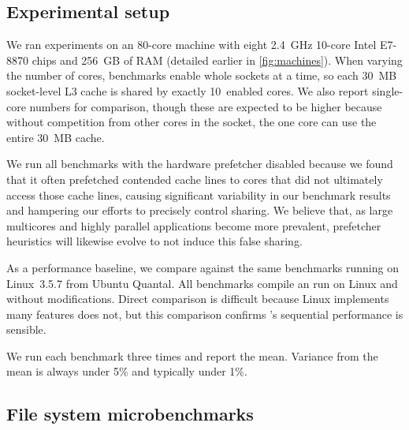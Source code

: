 \subsection{Experimental setup}
\label{sec:topic:ben}


We ran experiments on an 80-core machine with eight 2.4~GHz 10-core
Intel E7-8870 chips and 256~GB of RAM (detailed earlier in
\cref{fig:machines}).
%
When varying the number of
cores, benchmarks enable whole sockets at a time, so each 30~MB
socket-level L3 cache is shared by exactly 10~enabled cores.
We also report single-core numbers for
comparison, though these are expected to be higher because without
competition from other cores in the socket, the one
core can use the entire 30~MB cache.

We run all benchmarks with the hardware prefetcher disabled because we
found that it often prefetched contended cache lines to cores that did
not ultimately access those cache lines, causing significant
variability in our benchmark results and hampering our efforts to
precisely control sharing.  We believe that, as large multicores and
highly parallel applications become more prevalent, prefetcher
heuristics will likewise evolve to not induce this false sharing.

As a performance baseline, we compare against the same
benchmarks running on Linux~3.5.7 from Ubuntu Quantal.
%
All benchmarks compile an run on Linux and \sys without modifications.
%
Direct comparison is difficult because
Linux implements many features \sys does not, but this comparison
confirms \sys's sequential performance is sensible.

We run each benchmark three times and report the mean.  Variance from
the mean is always under 5\% and typically under 1\%.

\subsection{File system microbenchmarks}
\label{sec:eval:fs-microbenchmarks}

